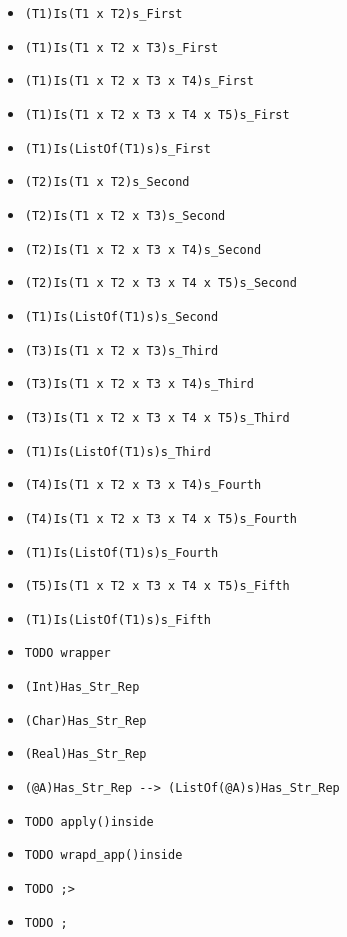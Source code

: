 \documentclass{article}
\begin{document}
\begin{itemize}
  \begin{itemize}
  \item \verb|(T1)Is(T1 x T2)s_First|
  \item \verb|(T1)Is(T1 x T2 x T3)s_First|
  \item \verb|(T1)Is(T1 x T2 x T3 x T4)s_First|
  \item \verb|(T1)Is(T1 x T2 x T3 x T4 x T5)s_First|
  \item \verb|(T1)Is(ListOf(T1)s)s_First|
  \item \verb|(T2)Is(T1 x T2)s_Second|
  \item \verb|(T2)Is(T1 x T2 x T3)s_Second|
  \item \verb|(T2)Is(T1 x T2 x T3 x T4)s_Second|
  \item \verb|(T2)Is(T1 x T2 x T3 x T4 x T5)s_Second|
  \item \verb|(T1)Is(ListOf(T1)s)s_Second|
  \item \verb|(T3)Is(T1 x T2 x T3)s_Third|
  \item \verb|(T3)Is(T1 x T2 x T3 x T4)s_Third|
  \item \verb|(T3)Is(T1 x T2 x T3 x T4 x T5)s_Third|
  \item \verb|(T1)Is(ListOf(T1)s)s_Third|
  \item \verb|(T4)Is(T1 x T2 x T3 x T4)s_Fourth|
  \item \verb|(T4)Is(T1 x T2 x T3 x T4 x T5)s_Fourth|
  \item \verb|(T1)Is(ListOf(T1)s)s_Fourth|
  \item \verb|(T5)Is(T1 x T2 x T3 x T4 x T5)s_Fifth|
  \item \verb|(T1)Is(ListOf(T1)s)s_Fifth|
  \item \verb|TODO wrapper|
  \item \verb|(Int)Has_Str_Rep|
  \item \verb|(Char)Has_Str_Rep|
  \item \verb|(Real)Has_Str_Rep|
  \item \verb|(@A)Has_Str_Rep --> (ListOf(@A)s)Has_Str_Rep|
  \item \verb|TODO apply()inside|
  \item \verb|TODO wrapd_app()inside|
  \item \verb|TODO ;>|
  \item \verb|TODO ;|
  \end{itemize}

\end{itemize}

\newpage
\end{document}
